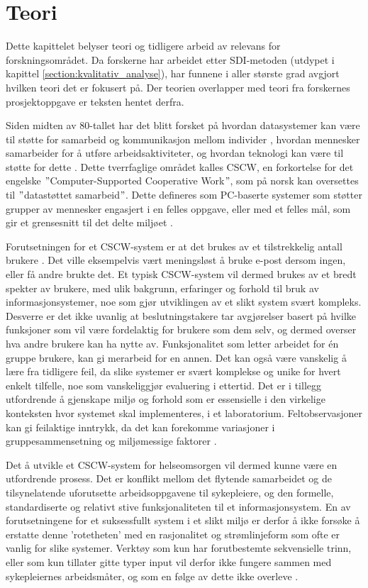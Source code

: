 \chapter{Teori}
\label{chp:teori} 

Dette kapittelet belyser teori og tidligere arbeid av relevans for forskningsområdet. Da forskerne har arbeidet etter SDI-metoden (utdypet i kapittel \ref{section:kvalitativ_analyse}), har funnene i aller største grad avgjort hvilken teori det er fokusert på. Der teorien overlapper med teori fra forskernes prosjektoppgave \citep{Sund13} er teksten hentet derfra. 

\noindent
Siden midten av 80-tallet har det blitt forsket på hvordan datasystemer kan være til støtte for samarbeid og kommunikasjon mellom individer \citep{Rogers94}, hvordan mennesker samarbeider for å utføre arbeidsaktiviteter, og hvordan teknologi kan være til støtte for dette \citep{Ellis91}. Dette tverrfaglige området kalles CSCW, en forkortelse for det engelske $"$Computer-Supported Cooperative Work$"$, som på norsk kan oversettes til $"$datastøttet samarbeid$"$. Dette defineres som PC-baserte systemer som støtter grupper av mennesker engasjert i en felles oppgave, eller med et felles mål, som gir et grensesnitt til det delte miljøet \citep{Ellis91}.

\noindent
Forutsetningen for et CSCW-system er at det brukes av et tilstrekkelig antall brukere \citep{Ackermann00}. Det ville eksempelvis vært meningsløst å bruke e-post dersom ingen, eller få andre brukte det. Et typisk CSCW-system vil dermed brukes av et bredt spekter av brukere, med ulik bakgrunn, erfaringer og forhold til bruk av informasjonsystemer, noe som gjør utviklingen av et slikt system svært kompleks. Desverre er det ikke uvanlig at beslutningstakere tar avgjørelser basert på hvilke funksjoner som vil være fordelaktig for brukere som dem selv, og dermed overser hva andre brukere kan ha nytte av. Funksjonalitet som letter arbeidet for én gruppe brukere, kan gi merarbeid for en annen. Det kan også være vanskelig å lære fra tidligere feil, da slike systemer er svært komplekse og unike for hvert enkelt tilfelle, noe som vanskeliggjør evaluering i ettertid. Det er i tillegg utfordrende å gjenskape miljø og forhold som er essensielle i den virkelige konteksten hvor systemet skal implementeres, i et laboratorium. Feltobservasjoner kan gi feilaktige inntrykk, da det kan forekomme variasjoner i gruppesammensetning og miljømessige faktorer \citep{Berg99}.

\noindent
Det å utvikle et CSCW-system for helseomsorgen vil dermed kunne være en utfordrende prosess. Det er konflikt mellom det flytende samarbeidet og de tilsynelatende uforutsette arbeidsoppgavene til sykepleiere, og den formelle, standardiserte og relativt stive funksjonaliteten til et informasjonsystem. En av forutsetningene for et suksessfullt system i et slikt miljø er derfor å ikke forsøke å erstatte denne 'rotetheten' med en rasjonalitet og strømlinjeform som ofte er vanlig for slike systemer. Verktøy som kun har forutbestemte sekvensielle trinn, eller som kun tillater gitte typer input vil derfor ikke fungere sammen med sykepleiernes arbeidsmåter, og som en følge av dette ikke overleve \citep{Berg99}.
